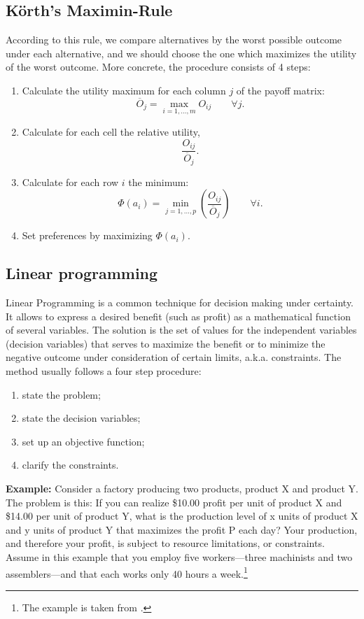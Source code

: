 \documentclass[
  12pt,
  oneside]{book}
\providecommand{\tightlist}{%
  \setlength{\itemsep}{0pt}\setlength{\parskip}{0pt}}
\theoremstyle{definition}
\theoremstyle{definition}
\theoremstyle{definition}
\theoremstyle{definition}
\theoremstyle{remark}
\begin{document}
\subsection*{Körth's Maximin-Rule}\label{kuxf6rths-maximin-rule}

According to this rule, we compare alternatives by the worst possible outcome under each alternative, and we should choose the one which maximizes the utility of the worst outcome. More concrete, the procedure consists of 4 steps:

\begin{enumerate}
\def\labelenumi{\arabic{enumi}.}
\tightlist
\item
  Calculate the utility maximum for each column \(j\) of the payoff matrix: \[\overline{O}_j=\max_{i=1,\dots,m}{O_{ij}}\qquad \forall j.\]
\item
  Calculate for each cell the relative utility, \[\frac{O_{ij}}{\overline{O}_j}.\]
\item
  Calculate for each row \(i\) the minimum: \[\Phi(a_i)=\min_{j=1,\dots,p}\left(\frac{O_{ij}}{\overline{O}_j}\right) \qquad \forall i.\]
\item
  Set preferences by maximizing \(\Phi(a_i)\).
\end{enumerate}

\subsection{Linear programming}\label{linear-programming}

Linear Programming is a common technique for decision making under certainty. It allows to express a desired benefit (such as profit) as a mathematical function of several variables. The solution is the set of values for the independent variables (decision variables) that serves to maximize the benefit or to minimize the negative outcome under consideration of certain limits, a.k.a. constraints. The method usually follows a four step procedure:

\begin{enumerate}
\def\labelenumi{\arabic{enumi}.}
\tightlist
\item
  state the problem;
\item
  state the decision variables;
\item
  set up an objective function;
\item
  clarify the constraints.
\end{enumerate}

\textbf{Example:}
Consider a factory producing two products, product X and product Y. The problem is this: If
you can realize \$10.00 profit per unit of product X and \$14.00 per unit of product Y, what is the production level of x units of product X and y units of product Y that maximizes the profit P each day? Your production, and therefore your profit, is subject to resource limitations, or constraints. Assume in this example that you employ five workers---three machinists and two assemblers---and that each works only 40 hours a week.\footnote{The example is taken from \citet[p.~134f]{Morse2014Managing}.}
\end{document}

